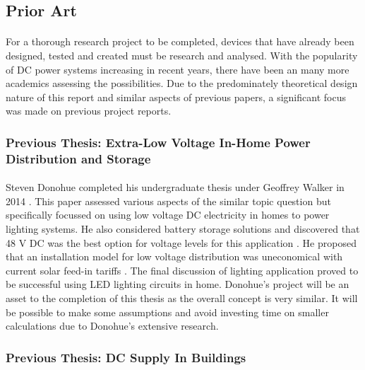 
\subsection{Prior Art}

\paragraph{}
For a thorough research project to be completed, devices that have already been designed, tested and created must be research and analysed. With the popularity of DC power systems increasing in recent years, there have been an many more academics assessing the possibilities. Due to the predominately theoretical design nature of this report and similar aspects of previous papers, a significant focus was made on previous project reports.  

\subsubsection{Previous Thesis: Extra-Low Voltage In-Home Power Distribution and Storage}

\paragraph{}
Steven Donohue completed his undergraduate thesis under Geoffrey Walker in 2014 \cite{Donohue2014}. This paper assessed various aspects of the similar topic question but specifically focussed on using low voltage DC electricity in homes to power lighting systems. He also considered battery storage solutions and discovered that 48 V DC was the best option for voltage levels for this application \cite{Donohue2014}. He proposed that an installation model for low voltage distribution was uneconomical with current solar feed-in tariffs \cite{Donohue2014}. The final discussion of lighting application proved to be successful using LED lighting circuits in home. Donohue's project will be an asset to the completion of this thesis as the overall concept is very similar. It will be possible to make some assumptions and avoid investing time on smaller calculations due to Donohue's extensive research.         

\subsubsection{Previous Thesis: DC Supply In Buildings}

